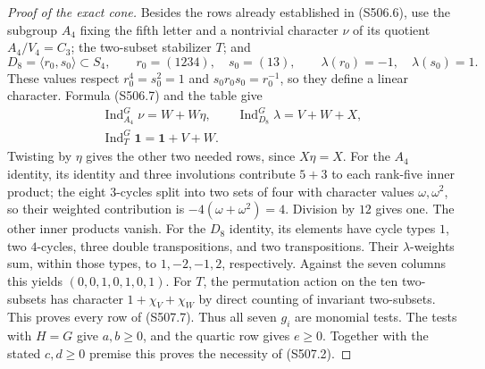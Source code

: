\begin{proof}[Proof of the exact cone]
Besides the rows already established in (S506.6), use the
subgroup $A_4$ fixing the fifth letter and a nontrivial
character $\nu$ of its quotient $A_4/V_4=C_3$; the two-subset
stabilizer $T$; and
\[
  D_8=\langle r_0,s_0\rangle\subset S_4,\qquad
  r_0=(1234),\quad s_0=(13),\qquad
  \lambda(r_0)=-1,\quad\lambda(s_0)=1.
\]
These values respect $r_0^4=s_0^2=1$ and
$s_0r_0s_0=r_0^{-1}$, so they define a linear character.
Formula (S506.7) and the table give
\[
 \begin{gathered}
 \operatorname{Ind}_{A_4}^{G}\nu=W+W\eta,\qquad
 \operatorname{Ind}_{D_8}^{G}\lambda=V+W+X,\\
 \operatorname{Ind}_{T}^{G}\mathbf1=\mathbf1+V+W.
 \end{gathered}
 \tag{S507.7}
\]
Twisting by $\eta$ gives the other two needed rows, since
$X\eta=X$.  For the $A_4$ identity, its identity and three
involutions contribute $5+3$ to each rank-five inner product;
the eight $3$-cycles split into two sets of four with character
values $\omega,\omega^2$, so their weighted contribution is
$-4(\omega+\omega^2)=4$.  Division by $12$ gives one.
The other inner products vanish.  For the $D_8$ identity,
its elements have cycle types $1$, two $4$-cycles, three double
transpositions, and two transpositions.  Their $\lambda$-weights
sum, within those types, to $1,-2,-1,2$, respectively.
Against the seven columns this yields
$(0,0,1,0,1,0,1)$.  For $T$, the permutation action on the ten
two-subsets has character $1+\chi_V+\chi_W$ by direct counting
of invariant two-subsets.  This proves every row of (S507.7).
Thus all seven $g_i$ are monomial tests.  The tests with
$H=G$ give $a,b\ge0$, and the quartic row gives $e\ge0$.
Together with the stated $c,d\ge0$ premise this proves the
necessity of (S507.2).


\end{proof}
